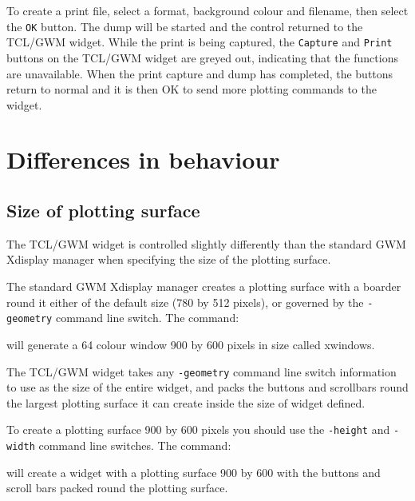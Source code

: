\documentclass[twoside,11pt,nolof]{starlink}
\begin{document}
To create a print file, select a format, background colour and filename,
then select the {\texttt{OK}} button.  The dump will be started and the control
returned to the TCL/GWM widget.  While the print is being captured, the
{\texttt{Capture}} and {\texttt{Print}} buttons on the TCL/GWM widget are greyed
out, indicating that the functions are unavailable.  When the print capture
and dump has completed, the buttons return to normal and it is then OK to
send more plotting commands to the widget.

\section{\label{differences}Differences in behaviour}

\subsection{\label{size_of_plotting_surface}Size of plotting surface}

The TCL/GWM widget is controlled slightly differently than the standard GWM
Xdisplay manager when specifying the size of the plotting surface.

The standard GWM Xdisplay manager creates a plotting surface with a boarder
round it either of the default size (780 by 512 pixels), or governed by the
{\texttt{-geometry}} command line switch.  The command:

\begin{terminalv}
\end{terminalv}

will generate a 64 colour window 900 by 600 pixels in size called xwindows.

The TCL/GWM widget takes any {\texttt{-geometry}} command line switch information
to use as the size of the entire widget, and packs the buttons and scrollbars
round the largest plotting surface it can create inside the size of widget
defined.

To create a plotting surface 900 by 600 pixels you should use the
{\texttt{-height}} and {\texttt{-width}} command line switches.  The command:

\begin{terminalv}
\end{terminalv}

will create a widget with a plotting surface 900 by 600 with the buttons
and scroll bars packed round the plotting surface.
\end{document}
